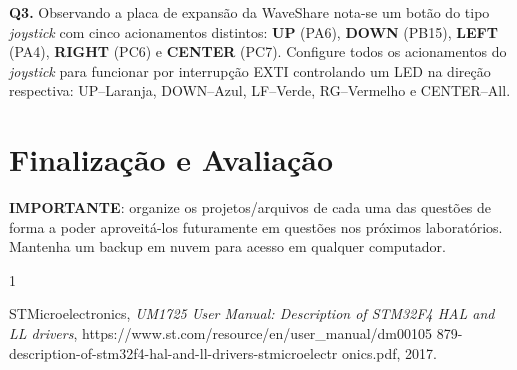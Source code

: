 \documentclass[12pt,journal,compsoc]{IEEEtran}
\begin{document}
\noindent\textbf{Q3.} Observando a placa de expansão da WaveShare nota-se um botão do tipo \emph{joystick} com cinco acionamentos distintos: \textbf{UP} (PA6), \textbf{DOWN} (PB15), \textbf{LEFT} (PA4), \textbf{RIGHT} (PC6) e \textbf{CENTER} (PC7).  Configure todos os acionamentos do \emph{joystick} para funcionar por interrupção EXTI controlando um LED na direção respectiva: UP--Laranja, DOWN--Azul, LF--Verde, RG--Vermelho e CENTER--All.

\section{Finalização e Avaliação}



\textbf{IMPORTANTE}: organize os projetos/arquivos de cada uma das questões de forma a poder aproveitá-los futuramente em questões nos próximos laboratórios. Mantenha um backup em nuvem para acesso em qualquer computador. 

%

\begin{thebibliography}{1}

STMicroelectronics, \textit{UM1725 User Manual: Description of STM32F4 HAL and LL drivers}, https://www.st.com/resource/en/user\_manual/dm00105 879-description-of-stm32f4-hal-and-ll-drivers-stmicroelectr onics.pdf, 2017.

\end{thebibliography}
\end{document}
